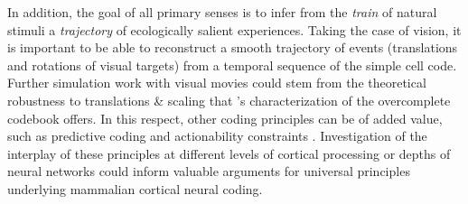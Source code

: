 \documentclass[
	a4paper, %
	11pt, %
	unnumberedsections, %
]{LTJournalArticle}
\begin{document}
In addition, the goal of all primary senses is to infer from the \textit{train} of natural stimuli a \textit{trajectory} of ecologically salient experiences. Taking the case of vision, it is important to be able to reconstruct a smooth trajectory of events (translations and rotations of visual targets) from a temporal sequence of the simple cell code. Further simulation work with visual movies could stem from the theoretical robustness to translations & scaling that \textcite{olshausenSparseCodingOvercomplete1997}'s characterization of the overcomplete codebook offers. In this respect, other coding principles can be of added value, such as predictive coding and actionability constraints \cite{Hohwy2008, Dorrell2023}. Investigation of the interplay of these principles at different levels of cortical processing or depths of neural networks could inform valuable arguments for universal principles underlying mammalian cortical neural coding. \\


\end{document}
